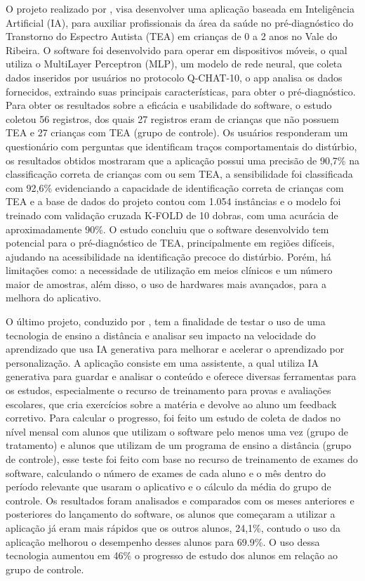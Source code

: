 O projeto realizado por \cite{Lauriano2024}, visa desenvolver uma aplicação baseada em Inteligência Artificial (IA), para auxiliar profissionais da área da saúde no  pré-diagnóstico do Transtorno do Espectro Autista (TEA) em crianças de 0 a 2 anos no Vale do Ribeira. O software foi desenvolvido para operar em dispositivos móveis, o qual utiliza o MultiLayer Perceptron (MLP), um modelo de rede neural, que coleta dados inseridos por usuários no protocolo Q-CHAT-10, o app analisa os dados fornecidos, extraindo suas principais características, para obter o pré-diagnóstico. Para obter os resultados sobre a eficácia e usabilidade do software, o estudo coletou 56 registros, dos quais 27 registros eram de crianças que não possuem TEA e 27 crianças com TEA (grupo de controle). Os usuários responderam um questionário com perguntas que identificam traços comportamentais do distúrbio, os resultados obtidos mostraram que a aplicação possui uma precisão de 90,7\% na classificação correta de crianças com ou sem TEA, a sensibilidade foi classificada com 92,6\% evidenciando a capacidade de identificação correta de crianças com TEA e a base de dados do projeto contou com 1.054 instâncias e o modelo foi treinado com validação cruzada K-FOLD de 10 dobras, com uma acurácia de aproximadamente 90\%. O estudo concluiu que o software desenvolvido tem potencial para o pré-diagnóstico de TEA, principalmente em regiões difíceis, ajudando na acessibilidade na identificação precoce do distúrbio. Porém, há limitações como: a necessidade de utilização em meios clínicos e um número maior de amostras, além disso, o uso de hardwares mais avançados, para a melhora do aplicativo. 

O último projeto, conduzido por \cite{Moller2024}, tem a finalidade de testar o uso de uma tecnologia de ensino a distância  e analisar seu impacto na velocidade do aprendizado que usa IA generativa para melhorar e acelerar o aprendizado por personalização. A aplicação consiste em uma assistente, a qual utiliza IA generativa para guardar e analisar o conteúdo e oferece diversas ferramentas para os estudos, especialmente o recurso de treinamento para provas e avaliações escolares, que cria exercícios sobre a matéria e devolve ao aluno um feedback corretivo. Para calcular o progresso, foi feito um estudo de coleta de dados no nível mensal com alunos que utilizam o software pelo menos uma vez (grupo de tratamento) e alunos que utilizam de um programa de ensino a distância (grupo de controle), esse teste foi feito com base no recurso de treinamento de exames do software, calculando o número de exames de cada aluno e o mês dentro do período relevante que usaram o aplicativo e o cálculo da média do grupo de controle. Os resultados foram analisados e comparados com os meses anteriores e posteriores do lançamento do software, os alunos que começaram a utilizar a aplicação já eram mais rápidos que os outros alunos, 24,1\%, contudo o uso da aplicação melhorou o desempenho desses alunos para 69.9\%. O uso dessa tecnologia aumentou em 46\% o progresso de estudo dos alunos em relação ao grupo de controle.

